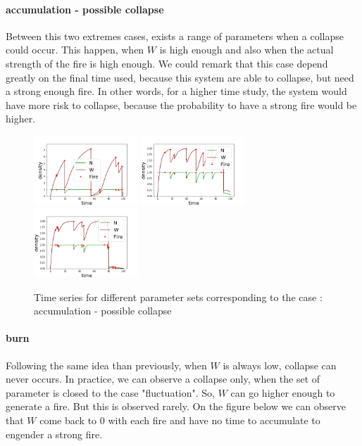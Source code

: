 \documentclass{article}
\begin{document}
\paragraph{accumulation - possible collapse \\} %
Between this two extremes cases, exists a range of parameters when a collapse could occur. This happen, when $W$ is high enough and also when the actual strength of the fire is high enough. We could remark that this case depend greatly on the final time used, because this system are able to collapse, but need a strong enough fire. In other words, for a higher time study, the system would have more risk to collapse, because the probability to have a strong fire would be higher.


\begin{figure}[h!]
\centering
\includegraphics[width=3.9cm]{return_between_1.png}
\includegraphics[width=3.9cm]{return_between_2.png}
\includegraphics[width=3.9cm]{return_between_3.png}
\caption{Time series for different parameter sets corresponding to the case : accumulation - possible collapse}
\end{figure}


\paragraph{burn \\}
Following the same idea than previously, when $W$ is always low, collapse can never occurs. In practice, we can observe a collapse only, when the set of parameter is closed to the case "fluctuation". So, $W$ can go higher enough to generate a fire. But this is observed rarely. On the figure below we can observe that $W$ come back to $0$ with each fire and have no time to accumulate to engender a strong fire.
\end{document}
